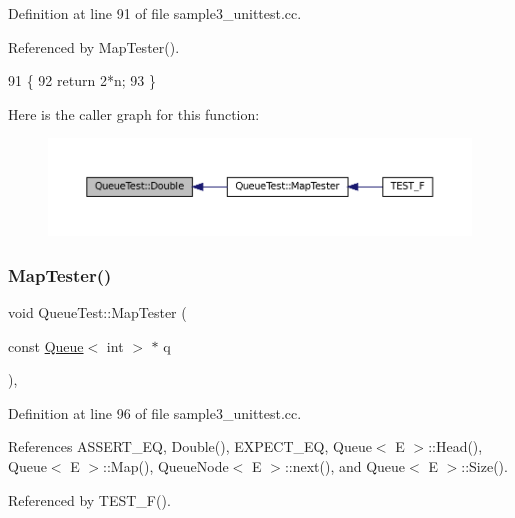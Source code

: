 Definition at line 91 of file sample3\+\_\+unittest.\+cc.



Referenced by Map\+Tester().


\begin{DoxyCode}
91                            \{
92     \textcolor{keywordflow}{return} 2*n;
93   \}
\end{DoxyCode}
Here is the caller graph for this function\+:
\nopagebreak
\begin{figure}[H]
\begin{center}
\leavevmode
\includegraphics[width=350pt]{classQueueTest_a2c7e0d1edb558dbbc4c085316d3d1ee6_icgraph}
\end{center}
\end{figure}
\mbox{\label{classQueueTest_a7f1661cd16c428a130d6ac1e4246eaab}} 
\subsubsection{\texorpdfstring{Map\+Tester()}{MapTester()}}
{\footnotesize\ttfamily void Queue\+Test\+::\+Map\+Tester (\begin{DoxyParamCaption}\item[{const \hyperlink{classQueue}{Queue}$<$ int $>$ $\ast$}]{q }\end{DoxyParamCaption})\hspace{0.3cm}{\ttfamily [inline]}, {\ttfamily [protected]}}



Definition at line 96 of file sample3\+\_\+unittest.\+cc.



References A\+S\+S\+E\+R\+T\+\_\+\+EQ, Double(), E\+X\+P\+E\+C\+T\+\_\+\+EQ, Queue$<$ E $>$\+::\+Head(), Queue$<$ E $>$\+::\+Map(), Queue\+Node$<$ E $>$\+::next(), and Queue$<$ E $>$\+::\+Size().



Referenced by T\+E\+S\+T\+\_\+\+F().


